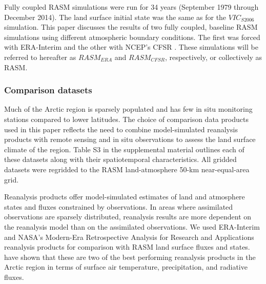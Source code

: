 Fully coupled RASM simulations were run for 34 years (September 1979 through December 2014).
The land surface initial state was the same as for the $VIC_{S2006}$ simulation.
This paper discusses the results of two fully coupled, baseline RASM simulations using different atmospheric boundary conditions.
The first was forced with ERA-Interim \citep{Dee_2011} and the other with NCEP's CFSR \citep{Saha_2011}.
These simulations will be referred to hereafter as $RASM_{ERA}$ and $RASM_{CFSR}$, respectively, or collectively as RASM.

\subsubsection{Comparison datasets}
\label{sec:datasets}

Much of the Arctic region is sparsely populated and has few in situ monitoring stations compared to lower latitudes.
The choice of comparison data products used in this paper reflects the need to combine model-simulated reanalysis products with remote sensing and in situ observations to assess the land surface climate of the region.
Table S3 in the supplemental material outlines each of these datasets along with their spatiotemporal characteristics.
All gridded datasets were regridded to the RASM land-atmosphere 50-km near-equal-area grid.

Reanalysis products offer model-simulated estimates of land and atmosphere states and fluxes constrained by observations.
In areas where assimilated observations are sparsely distributed, reanalysis results are more dependent on the reanalysis model than on the assimilated observations.
We used ERA-Interim \citep[also referred to hereafter as ERA; ][]{Dee_2011} and NASA's Modern-Era Retrospective Analysis for Research and Applications \citep[MERRA; ][]{Rienecker_2011} reanalysis products for comparison with RASM land surface fluxes and states.
\citet{Lindsay_2014} have shown that these are two of the best performing reanalysis products in the Arctic region in terms of surface air temperature, precipitation, and radiative fluxes.

